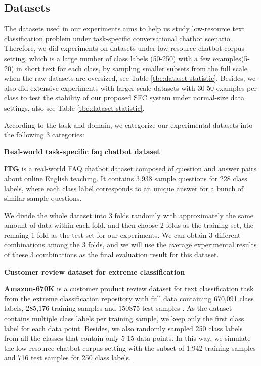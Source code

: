 \documentclass[letterpaper]{article} %
\begin{document}
  \subsection{Datasets}
  The  datasets  used in our experiments aims to help us study low-resource text
  classification  problem  under  task-specific conversational chatbot scenario.
  Therefore,  we did experiments on datasets under low-resource chatbot corpus setting,
  which  is a large number of class labels (50-250) with a few examples(5-20) in
  short  text  for  each  class, by sampling smaller subsets from the full scale
  when the raw datasets are oversized, see Table \ref{tbe:dataset statistic}. Besides, we also did extensive experiments with larger scale datasets with 30-50 examples per class to test the stability of our proposed SFC system under normal-size data settings, also see Table \ref{tbe:dataset statistic}.

  According to the task and domain, we categorize our experimental datasets into
  the following 3 categories:

  \textbf{Real-world task-specific faq chatbot dataset}

  \textbf{ITG}  is  a  real-world  FAQ  chatbot dataset composed of question and
  answer pairs about online English teaching. It contains 3,938 sample questions
  for  228  class labels, where each class label corresponds to an unique answer
  for a bunch of similar sample questions.

  We  divide the whole dataset into 3 folds randomly with approximately the same
  amount  of data within each fold, and then choose 2 folds as the training set,
  the  remaing  1  fold  as  the  test  set for our experiments. We can obtain 3
  different  combinations  among  the  3  folds,  and  we  will  use the average
  experimental  results  of  these 3 combinations as the final evaluation result
  for this dataset.

  \textbf{Customer review dataset for extreme classification}

  \textbf{Amazon-670K}   is   a   customer   product  review  dataset  for  text
  classification  task from the extreme classification repository with full data
  containing  670,091  class  labels,  285,176  training samples and 150875 test
  samples \cite{bhatia2016extreme}.  As  the  dataset  contains  multiple class
  labels  per  training sample, we keep only the first class label for each data
  point. Besides, we also randomly sampled 250 class labels from all the classes
  that  contain only 5-15 data points. In this way, we simulate the low-resource
  chatbot  corpus setting with the subset of 1,942 training samples and 716 test
  samples for 250 class labels.
\end{document}

